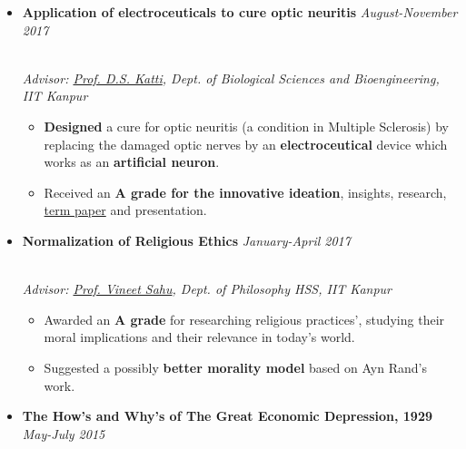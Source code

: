 \documentclass{article}
\begin{document}
\vspace{-2mm}


\begin{itemize}

\item \textbf{Application of electroceuticals to cure optic neuritis}
     \hfill\textit{August-November 2017}
     
     \vspace{-1mm}
     
     \\[3pt] \textit{\small Advisor: \href{https://www.iitk.ac.in/new/dhirendra-s-katti}{Prof. D.S. Katti}, Dept. of Biological Sciences and Bioengineering, IIT Kanpur  }  
    \begin{itemize}
        \item \textbf{Designed} a cure for optic neuritis (a condition in Multiple Sclerosis) by replacing the damaged optic nerves by an \textbf{electroceutical} device which works as an \textbf{artificial neuron}. 
        \item Received an \textbf{A grade for the innovative ideation}, insights, research, \href{https://github.com/aman161upadhyay/Projects-Term-Papers/blob/master/Biomaterial_Term%20Paper_OpticNeuritis.pdf}{ term paper} and presentation. 
    \end{itemize}
    
  
    
    \item \textbf{Normalization of Religious Ethics}
     \hfill\textit{January-April 2017}
     \vspace{-1mm}
     
     \\[3pt]  \textit{\small Advisor: \href{http://home.iitk.ac.in/~vineet/}{Prof. Vineet Sahu}, Dept. of Philosophy HSS,
     IIT Kanpur  }
    \begin{itemize}
        \item Awarded an \textbf{A grade} for researching religious practices', studying their moral implications and their relevance in today's world.
        \item Suggested a possibly \textbf{better morality model} based on Ayn Rand's work. 
    \end{itemize}
    
    \item \textbf{The How’s and Why’s of The Great Economic Depression, 1929}   \hfill\textit{May-July 2015} \\
    

\end{itemize}
\end{document}
